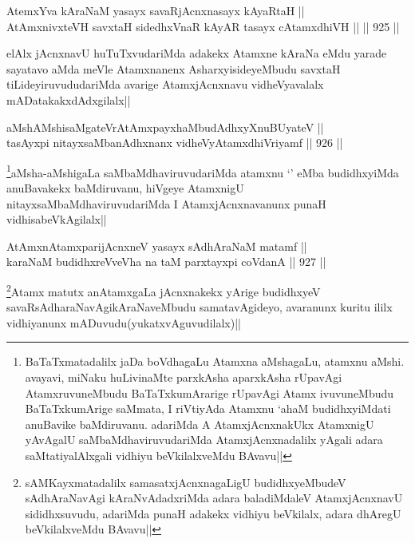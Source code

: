 \begin{shl}
AtemxYva kAraNaM yasayx savaRjAcnxnasayx kAyaRtaH || \\
AtAmxnivxteVH savxtaH sidedhxVnaR kAyAR tasayx cA\s \s tamxdhiVH ||  ||  925 ||  
\end{shl}

\begin{artha}
elAlx jAcnxnavU huTuTxvudariMda adakekx Atamxne kAraNa eMdu yarade sayatavo aMda meVle Atamxnanenx AsharxyisideyeMbudu savxtaH tiLideyiruvududariMda avarige AtamxjAcnxnavu vidheVyavalalx mADatakakxdAdxgilalx||
\end{artha}


\begin{shl}
aMshAMshisaMgateVrAtAmx\s payxhaMbudAdhxyX\s nuBUyateV || \\
tasAyxpi nitayxsaMbanAdhxnanx vidheVyA\s \s tamxdhiVriyamf ||  926 ||  
\end{shl}

\begin{artha}
\footnote{BaTaTxmatadalilx jaDa boVdhagaLu Atamxna aMshagaLu, atamxnu aMshi. avayavi, miNaku huLivinaMte parxkAsha aparxkAsha rUpavAgi AtamxruvuneMbudu BaTaTxkumArarige rUpavAgi Atamx ivuvuneMbudu BaTaTxkumArige saMmata, I riVtiyAda Atamxnu `ahaM budidhxyiMdati anuBavike baMdiruvanu. adariMda A AtamxjAcnxnakUkx AtamxnigU yAvAgalU saMbaMdhaviruvudariMda AtamxjAcnxnadalilx yAgali adara saMtatiyalAlxgali vidhiyu beVkilalxveMdu BAvavu||}aMsha-aMshigaLa saMbaMdhaviruvudariMda atamxnu `\stext' eMba budidhxyiMda anuBavakekx baMdiruvanu, hiVgeye AtamxnigU nitayxsaMbaMdhaviruvudariMda I AtamxjAcnxnavanunx punaH vidhisabeVkAgilalx||
\end{artha}


\begin{shl}
AtAmxnAtamxparijAcnxneV yasayx sAdhAraNaM matamf || \\
karaNaM budidhxreVveVha na taM parxtayxpi coVdanA ||  927 ||  
\end{shl}

\begin{artha}
\footnote{sAMKayxmatadalilx samasatxjAcnxnagaLigU budidhxyeMbudeV sAdhAraNavAgi kAraNvAdadxriMda adara baladiMdaleV AtamxjAcnxnavU sididhxsuvudu, adariMda punaH adakekx vidhiyu beVkilalx, adara dhAregU beVkilalxveMdu BAvavu||}Atamx matutx anAtamxgaLa jAcnxnakekx yArige budidhxyeV savaRsAdharaNavAgikAraNaveMbudu samatavAgideyo, avaranunx kuritu ililx vidhiyanunx mADuvudu(yukatxvAguvudilalx)||
\end{artha}

